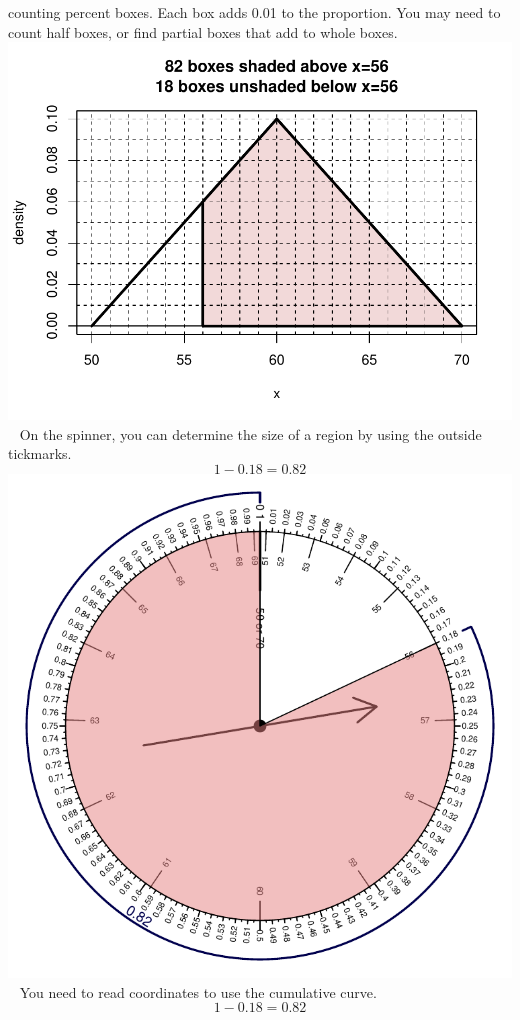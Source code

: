 \begin{solution}
\begin{answerlist}
counting percent boxes. Each box adds 0.01 to the proportion. You may
need to count half boxes, or find partial boxes that add to whole boxes.
\includegraphics{unnamed-chunk-17-1.pdf} ~ On the spinner, you can
determine the size of a region by using the outside tickmarks.
\[1-0.18=0.82\] \includegraphics{unnamed-chunk-18-1.pdf} ~ You need to
read coordinates to use the cumulative curve. \[1-0.18=0.82\]

\end{answerlist}
\end{solution}
